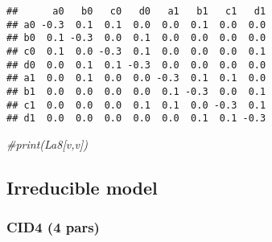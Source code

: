 \documentclass[
]{article}
\newenvironment{Shaded}{\begin{snugshade}}{\end{snugshade}}
\newcommand{\AttributeTok}[1]{\textcolor[rgb]{0.13,0.29,0.53}{#1}}
\newcommand{\CommentTok}[1]{\textcolor[rgb]{0.56,0.35,0.01}{\textit{#1}}}
\newcommand{\DecValTok}[1]{\textcolor[rgb]{0.00,0.00,0.81}{#1}}
\newcommand{\FunctionTok}[1]{\textcolor[rgb]{0.13,0.29,0.53}{\textbf{#1}}}
\newcommand{\NormalTok}[1]{#1}
\newcommand{\OtherTok}[1]{\textcolor[rgb]{0.56,0.35,0.01}{#1}}
\newcommand{\SpecialCharTok}[1]{\textcolor[rgb]{0.81,0.36,0.00}{\textbf{#1}}}
\begin{document}
\begin{verbatim}
##      a0   b0   c0   d0   a1   b1   c1   d1
## a0 -0.3  0.1  0.1  0.0  0.0  0.1  0.0  0.0
## b0  0.1 -0.3  0.0  0.1  0.0  0.0  0.0  0.0
## c0  0.1  0.0 -0.3  0.1  0.0  0.0  0.0  0.1
## d0  0.0  0.1  0.1 -0.3  0.0  0.0  0.0  0.0
## a1  0.0  0.1  0.0  0.0 -0.3  0.1  0.1  0.0
## b1  0.0  0.0  0.0  0.0  0.1 -0.3  0.0  0.1
## c1  0.0  0.0  0.0  0.1  0.1  0.0 -0.3  0.1
## d1  0.0  0.0  0.0  0.0  0.0  0.1  0.1 -0.3
\end{verbatim}

\begin{Shaded}
\begin{Highlighting}[]
\CommentTok{\#print(La8[v,v])}
\end{Highlighting}
\end{Shaded}

\hypertarget{irreducible-model}{%
\subsection{Irreducible model}\label{irreducible-model}}

\hypertarget{cid4-4-pars}{%
\subsubsection{CID4 (4 pars)}\label{cid4-4-pars}}

\begin{Shaded}
\end{Shaded}
\end{document}

